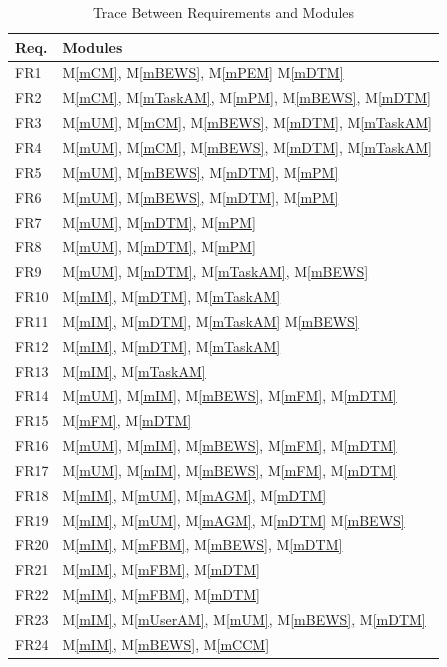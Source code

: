 \documentclass[12pt, titlepage]{article}
\newcommand{\mref}[1]{M\ref{#1}}
\begin{document}
\begin{table}[H]
\centering
\begin{tabular}{p{} p{}}
\toprule
\textbf{Req.} & \textbf{Modules}\\
\midrule
FR1 & \mref{mCM}, \mref{mBEWS}, \mref{mPEM} \mref{mDTM}\\
FR2 & \mref{mCM}, \mref{mTaskAM}, \mref{mPM}, \mref{mBEWS}, \mref{mDTM}\\
FR3 & \mref{mUM}, \mref{mCM}, \mref{mBEWS}, \mref{mDTM}, \mref{mTaskAM}\\
FR4 & \mref{mUM}, \mref{mCM}, \mref{mBEWS}, \mref{mDTM}, \mref{mTaskAM}\\
FR5 & \mref{mUM}, \mref{mBEWS}, \mref{mDTM}, \mref{mPM}\\
FR6 & \mref{mUM}, \mref{mBEWS}, \mref{mDTM}, \mref{mPM}\\
FR7 & \mref{mUM}, \mref{mDTM}, \mref{mPM}\\
FR8 & \mref{mUM}, \mref{mDTM}, \mref{mPM}\\
FR9 & \mref{mUM}, \mref{mDTM}, \mref{mTaskAM}, \mref{mBEWS}\\
FR10 & \mref{mIM}, \mref{mDTM}, \mref{mTaskAM}\\
FR11 & \mref{mIM}, \mref{mDTM}, \mref{mTaskAM} \mref{mBEWS}\\
FR12 & \mref{mIM}, \mref{mDTM}, \mref{mTaskAM}\\
FR13 & \mref{mIM}, \mref{mTaskAM}\\
FR14 & \mref{mUM}, \mref{mIM}, \mref{mBEWS}, \mref{mFM}, \mref{mDTM}\\
FR15 & \mref{mFM}, \mref{mDTM}\\
FR16 & \mref{mUM}, \mref{mIM}, \mref{mBEWS}, \mref{mFM}, \mref{mDTM}\\
FR17 & \mref{mUM}, \mref{mIM}, \mref{mBEWS}, \mref{mFM}, \mref{mDTM}\\
FR18 & \mref{mIM}, \mref{mUM}, \mref{mAGM}, \mref{mDTM}\\
FR19 & \mref{mIM}, \mref{mUM}, \mref{mAGM}, \mref{mDTM} \mref{mBEWS}\\
FR20 & \mref{mIM}, \mref{mFBM}, \mref{mBEWS}, \mref{mDTM}\\
FR21 & \mref{mIM}, \mref{mFBM}, \mref{mDTM}\\
FR22 & \mref{mIM}, \mref{mFBM}, \mref{mDTM}\\
FR23 & \mref{mIM}, \mref{mUserAM}, \mref{mUM}, \mref{mBEWS}, \mref{mDTM}\\
FR24 & \mref{mIM}, \mref{mBEWS}, \mref{mCCM}\\
\bottomrule
\end{tabular}
\caption{Trace Between Requirements and Modules}
\label{TblRT}
\end{table}
\end{document}
